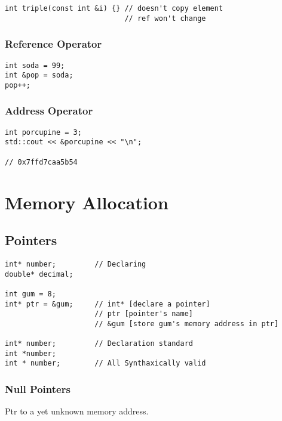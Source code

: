 \begin{verbatim}
int triple(const int &i) {} // doesn't copy element
                            // ref won't change
\end{verbatim}

\subsection{Reference Operator}

\begin{verbatim}
int soda = 99; 
int &pop = soda;
pop++;
\end{verbatim}

\subsection{Address Operator}

\begin{verbatim}
int porcupine = 3; 
std::cout << &porcupine << "\n"; 

// 0x7ffd7caa5b54
\end{verbatim}

\chapter{Memory Allocation}
\section{Pointers}

\begin{verbatim}
int* number;         // Declaring
double* decimal;

int gum = 8;
int* ptr = &gum;     // int* [declare a pointer]
                     // ptr [pointer's name]
                     // &gum [store gum's memory address in ptr]

int* number;         // Declaration standard
int *number;
int * number;        // All Synthaxically valid
\end{verbatim}

\subsection{Null Pointers}

Ptr to a yet unknown memory address.

